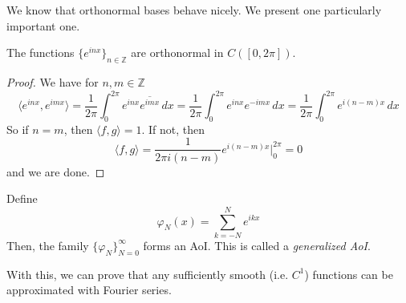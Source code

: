   We know that orthonormal bases behave nicely. We present one particularly important one. 

  \begin{lemma} 
    The functions $\{e^{inx}\}_{n \in \mathbb{Z}}$ are orthonormal in $C([0, 2\pi])$.
  \end{lemma} 
  \begin{proof}
    We have for $n, m \in \mathbb{Z}$
    \begin{equation}
      \langle e^{inx}, e^{imx} \rangle = \frac{1}{2\pi} \int_0^{2\pi} e^{inx} \overline{e^{imx}} \,dx = \frac{1}{2\pi} \int_0^{2\pi} e^{inx} e^{-imx} \,dx = \frac{1}{2\pi} \int_0^{2\pi} e^{i(n-m) x} \,dx
    \end{equation}
    So if $n = m$, then $\langle f, g \rangle = 1$. If not, then 
    \begin{equation}
      \langle f, g \rangle = \frac{1}{2 \pi i (n - m)} e^{i (n - m) x} \bigg|_0^{2\pi} = 0 
    \end{equation}
    and we are done. 
  \end{proof}

  \begin{lemma}
    Define 
    \begin{equation}
      \varphi_N (x) = \sum_{k = -N}^{N} e^{i k x}
    \end{equation}
    Then, the family $\{\varphi_N\}_{N = 0}^\infty$ forms an AoI. This is called a \textit{generalized AoI}. 
  \end{lemma}

  With this, we can prove that any sufficiently smooth (i.e. $C^1$) functions can be approximated with Fourier series. 

